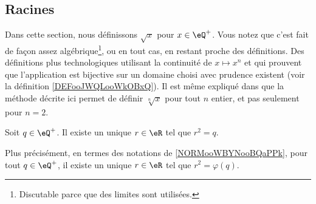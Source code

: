 \subsection{Racines}
\label{SUBSECooMBCNooEqjjTY}

Dans cette section, nous définissons \( \sqrt{ x }\) pour \( x\in\eQ^+\). Vous notez que c'est fait de façon assez algébrique\footnote{Discutable parce que des limites sont utilisées.}, ou en tout cas, en restant proche des définitions. Des définitions plus technologiques utilisant la continuité de \( x\mapsto x^n\) et qui prouvent que l'application est bijective sur un domaine choisi avec prudence existent (voir la définition \ref{DEFooJWQLooWkOBxQ}). Il est même expliqué dans \cite{BIBooMPXEooQLKhku} que la méthode décrite ici permet de définir \( \sqrt[n]{ x }\) pour tout \( n\) entier, et pas seulement pour \( n=2\).

\begin{proposition}     \label{PROPooUHKFooVKmpte}
	Soit \( q\in \eQ^+\). Il existe un unique \( r\in \eR\) tel que \( r^2=q\).

	Plus précisément, en termes des notations de \ref{NORMooWBYNooBQaPPk}, pour tout \( q\in \eQ^+\), il existe un unique \( r\in \eR\) tel que \( r^2=\varphi(q)\).
\end{proposition}

